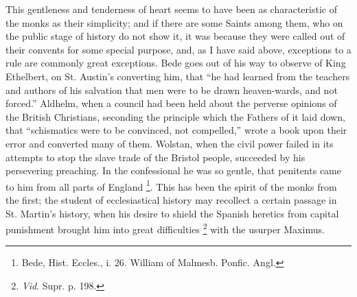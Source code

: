 This gentleness and tenderness of heart seems to have been as
characteristic of the monks as their simplicity; and if there are some
Saints among them, who on the public stage of history do not show it,
it was because they were called out of their convents for some special
purpose, and, as I have said above, exceptions to a rule are commonly
great exceptions. Bede goes out of his way to observe of King
Ethelbert, on St. Austin's converting him, that ``he had learned
from the teachers and authors of his salvation that men were to be
drawn heaven-wards, and not forced.'' Aldhelm, when a council had
been held about the perverse opinions of the British Christians,
seconding the principle which the Fathers of it laid down, that ``schismatics
were to be convinced, not compelled,'' wrote a book upon their
error and converted many of them. Wolstan, when the civil power failed
in its attempts to stop the slave trade of the Bristol people,
succeeded by his persevering preaching. In the confessional he was so
gentle, that penitents came to him from all parts of England \footnote{Bede, Hist.
Eccles., i. 26. William of Malmesb. Ponfic. Angl.}. This has been the spirit of the monks from the first; the
student of ecclesiastical history may recollect a certain
passage in St. Martin's history, when his desire to shield the Spanish
heretics from capital punishment brought him into great difficulties \footnote{\emph{Vid}.
Supr. p. 198.} with the usurper Maximus.

